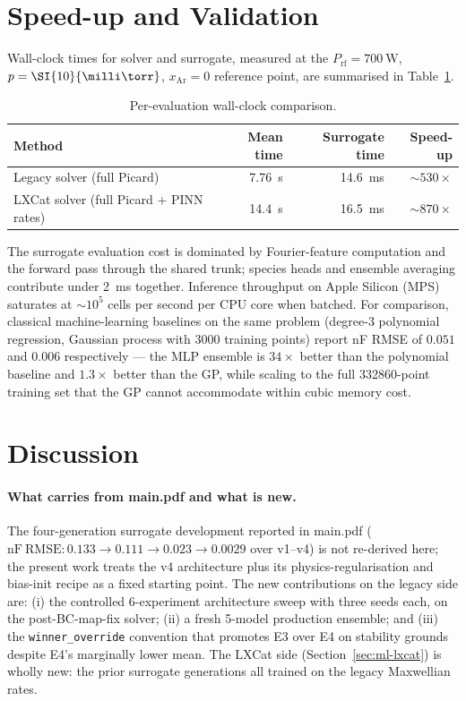 \section{Speed-up and Validation}
\label{sec:ml-speedup}

Wall-clock times for solver and surrogate, measured at the
$P_\mathrm{rf}=\SI{700}{\watt}$, $p=\SI{10}{\milli\torr}$, $x_\mathrm{Ar}=0$
reference point, are summarised in Table~\ref{tab:ml-speedup}.

\begin{table}[h]
\centering
\caption{Per-evaluation wall-clock comparison.}
\label{tab:ml-speedup}
\small
\begin{tabular}{l r r r}
\toprule
Method & Mean time & Surrogate time & Speed-up \\
\midrule
Legacy solver (full Picard)             & \SI{7.76}{\second} & \SI{14.6}{\milli\second} & $\sim$$530\times$ \\
LXCat solver (full Picard + PINN rates) & \SI{14.4}{\second} & \SI{16.5}{\milli\second} & $\sim$$870\times$ \\
\bottomrule
\end{tabular}
\end{table}

The surrogate evaluation cost is dominated by Fourier-feature computation and
the forward pass through the shared trunk; species heads and ensemble
averaging contribute under \SI{2}{\milli\second} together. Inference throughput
on Apple Silicon (MPS) saturates at $\sim$$10^5$ cells per second per CPU core
when batched. For comparison, classical machine-learning baselines on the same
problem (degree-3 polynomial regression, Gaussian process with 3000 training
points) report nF RMSE of $0.051$ and $0.006$ respectively — the MLP ensemble
is $34\times$ better than the polynomial baseline and $1.3\times$ better than
the GP, while scaling to the full \num{332860}-point training set that the
GP cannot accommodate within cubic memory cost.

\section{Discussion}
\label{sec:ml-discussion}

\paragraph{What carries from main.pdf and what is new.}
The four-generation surrogate development reported in main.pdf
($\mathrm{nF}\ \mathrm{RMSE}: 0.133 \to 0.111 \to 0.023 \to 0.0029$ over
v1--v4) is not re-derived here; the present work treats the v4 architecture
plus its physics-regularisation and bias-init recipe as a fixed starting
point. The new contributions on the legacy side are: (i) the controlled
6-experiment architecture sweep with three seeds each, on the post-BC-map-fix
solver; (ii) a fresh 5-model production ensemble; and (iii) the
\texttt{winner\_override} convention that promotes E3 over E4 on stability
grounds despite E4's marginally lower mean. The LXCat side
(Section~\ref{sec:ml-lxcat}) is wholly new: the prior surrogate generations
all trained on the legacy Maxwellian rates.

